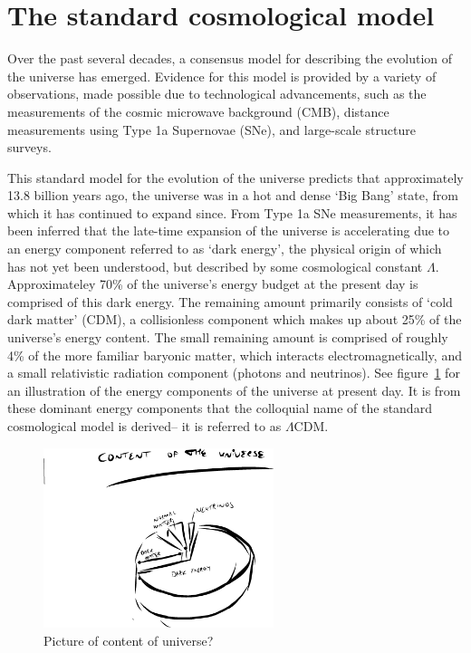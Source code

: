 \section{The standard cosmological model}

Over the past several decades, a consensus model for describing the evolution of the universe has emerged.  Evidence for this model is provided by a variety of observations, made possible due to technological advancements, such as the measurements of the cosmic microwave background (CMB), distance measurements using Type 1a Supernovae (SNe), and large-scale structure surveys. 

This standard model for the evolution of the universe predicts that approximately 13.8 billion years ago, the universe was in a hot and dense `Big Bang' state, from which it has continued to expand since. From Type 1a SNe measurements, it has been inferred that the late-time expansion of the universe is accelerating due to an energy component referred to as `dark energy', the physical origin of which has not yet been understood, but described by some cosmological constant $\Lambda$. Approximateley 70\% of the universe's energy budget at the present day is comprised of this dark energy. The remaining amount primarily consists of `cold dark matter' (CDM), a collisionless component which makes up about 25\% of the universe's energy content. The small remaining amount is comprised of roughly 4\% of the more familiar baryonic matter, which interacts electromagnetically, and a small relativistic radiation component (photons and neutrinos). See figure~\ref{fig:contentuniverse} for an illustration of the energy components of the universe at present day. It is from these dominant energy components that the colloquial name of the standard cosmological model is derived-- it is referred to as $\Lambda$CDM.
\begin{figure}[ht]
	\centering
	\includegraphics[width=0.6\textwidth]{fig/placeholder_universecontent.png}
	\caption{Picture of content of universe?}
	\label{fig:contentuniverse}
\end{figure}

